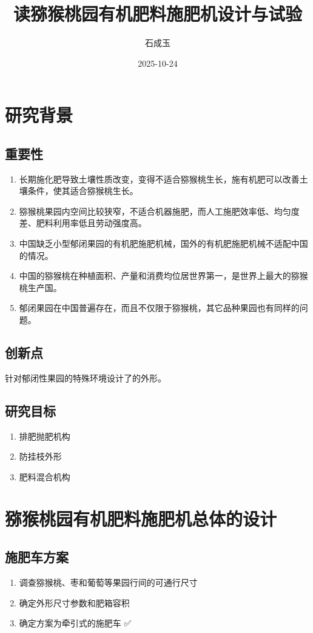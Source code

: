 \documentclass{ctexart}
\title{读猕猴桃园有机肥料施肥机设计与试验}
\author{石成玉}
\date{2025-10-24}
\begin{document}
\maketitle

\tableofcontents

\section{研究背景}

\subsection{重要性}

\begin{enumerate}
	\item 长期施化肥导致土壤性质改变，变得不适合猕猴桃生长，施有机肥可以改善土壤条件，使其适合猕猴桃生长。
	\item 猕猴桃果园内空间比较狭窄，不适合机器施肥，而人工施肥效率低、均匀度差、肥料利用率低且劳动强度高。
	\item 中国缺乏小型郁闭果园的有机肥施肥机械，国外的有机肥施肥机械不适配中国的情况。
	\item 中国的猕猴桃在种植面积、产量和消费均位居世界第一，是世界上最大的猕猴桃生产国。
	\item 郁闭果园在中国普遍存在，而且不仅限于猕猴桃，其它品种果园也有同样的问题。
\end{enumerate}

\subsection{创新点}

针对郁闭性果园的特殊环境设计了的外形。

\subsection{研究目标}

\begin{enumerate}
	\item 排肥抛肥机构
	\item 防挂枝外形
	\item 肥料混合机构
\end{enumerate}

\section{猕猴桃园有机肥料施肥机总体的设计}

\subsection{施肥车方案}

\begin{enumerate}
	\item 调查猕猴桃、枣和葡萄等果园行间的可通行尺寸
	\item 确定外形尺寸参数和肥箱容积
	\item 确定方案为牵引式的施肥车 ✅
\end{enumerate}
\end{document}
